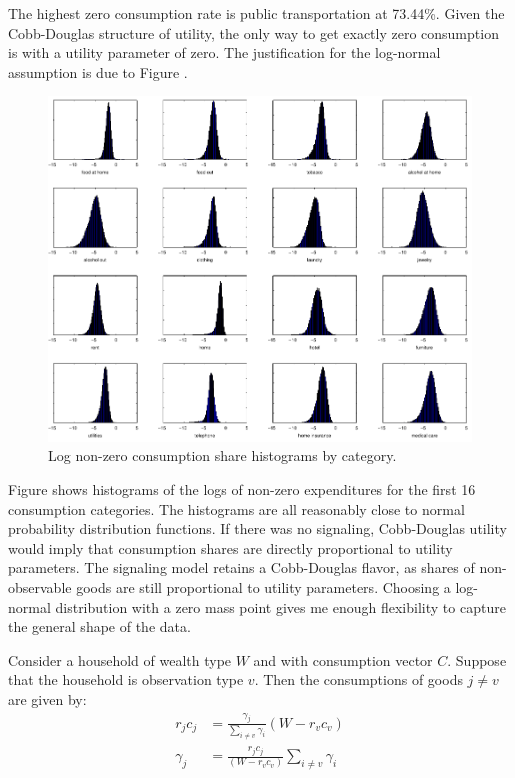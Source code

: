 \documentclass{article}
\begin{document}
The highest zero consumption rate is public transportation at 73.44\%.  
Given the Cobb-Douglas structure of utility, the only way to get exactly zero consumption is with a utility parameter of zero.
The justification for the log-normal assumption is due to Figure .
\begin{figure}
	\begin{center}
		\includegraphics[scale=1]{pics/shrplot_cropped.pdf}
	\end{center}
	\caption{Log non-zero consumption share histograms by category.}
	\label{fig:shrplot}
\end{figure}
Figure  shows histograms of the logs of non-zero expenditures for the first 16 consumption categories.  
The histograms are all reasonably close to normal probability distribution functions.
If there was no signaling, Cobb-Douglas utility would imply that consumption shares are directly proportional to utility parameters.
The signaling model retains a Cobb-Douglas flavor, as shares of non-observable goods are still proportional to utility parameters.
Choosing a log-normal distribution with a zero mass point gives me enough flexibility to capture the general shape of the data.

Consider a household of wealth type $W$ and with consumption vector $C$.  
Suppose that the household is observation type $v$.
Then the consumptions of goods $j\neq v$ are given by:
\begin{align}
	\label{eq:sgd}
	r_jc_j &= \frac{\gamma_j}{\sum_{i\neq v}\gamma_i}  \left(W-  r_v c_v\right)\\
	\label{eq:sgdsol}
	\gamma_j &= \frac{r_j c_j}{\left(W- r_v c_v\right)} \sum_{i\neq v}\gamma_i  
\end{align}
\end{document}
